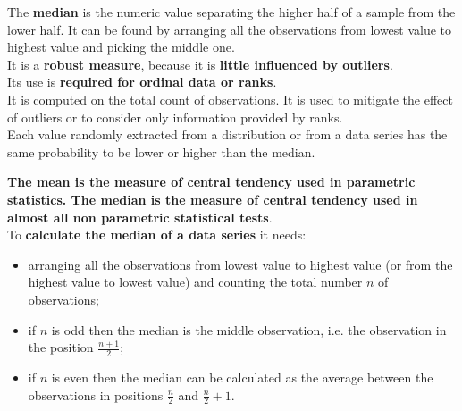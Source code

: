\begin{frame}
  \vspace{.35cm}
  The \textbf{median} is the numeric value separating the higher half of a sample from the lower half. It can be found by arranging all the observations from lowest value to highest value and picking the middle one.\\
  \vspace{.35cm}
  It is a \textbf{robust measure}, because it is \textbf{little influenced by outliers}.\\
  \vspace{.35cm}
  Its use is \textbf{required for ordinal data or ranks}.\\
  \vspace{.35cm}
  It is computed on the total count of observations. It is used to mitigate the effect of outliers or to consider only information provided by ranks. \\
  \vspace{.35cm}
  Each value randomly extracted from a distribution or from a data series has the same probability to be lower or higher than the median.
\end{frame}

\begin{frame}
  \vspace{.25cm}
  \textbf{The mean is the measure of central tendency used in parametric statistics. The median is the measure of central tendency used in almost all non parametric statistical tests}.\\
  \vspace{.25cm}
  To \textbf{calculate the median of a data series} it needs:\\
  \vspace{.25cm}
  \begin{itemize}
    \item arranging all the observations from lowest value to highest value (or from the highest value to lowest value) and counting the total number $n$ of observations;
    \vspace{.15cm}
    \item if $n$ is odd then the median is the middle observation, i.e. the observation in the position {\boldmath $\frac{n+1}{2}$};
    \vspace{.15cm}
    \item if $n$ is even then the median can be calculated as the average between the observations in positions {\boldmath $\frac{n}{2}$} and {\boldmath $\frac{n}{2}+1$}.
  \end{itemize}
\end{frame}

